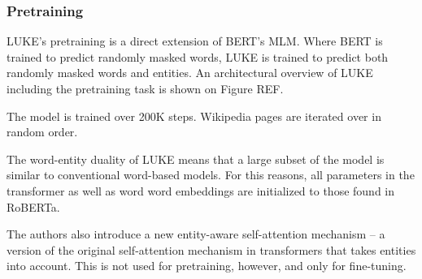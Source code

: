 \documentclass[main.tex]{subfiles}
\begin{document}
\subsubsection{Pretraining}
LUKE's pretraining is a direct extension of BERT's MLM. \cite{devlin2019bert}
Where BERT is trained to predict randomly masked words, LUKE is trained to predict both randomly masked words and entities.
An architectural overview of LUKE including the pretraining task is shown on Figure REF.

The model is trained over 200K steps.
Wikipedia pages are iterated over in random order.

The word-entity duality of LUKE means that a large subset of the model is similar to conventional word-based models.
For this reasons, all parameters in the transformer as well as word word embeddings are initialized to those found in RoBERTa.

The authors also introduce a new entity-aware self-attention mechanism -- a version of the original self-attention mechanism in transformers that takes entities into account.
This is not used for pretraining, however, and only for fine-tuning.



\end{document}

